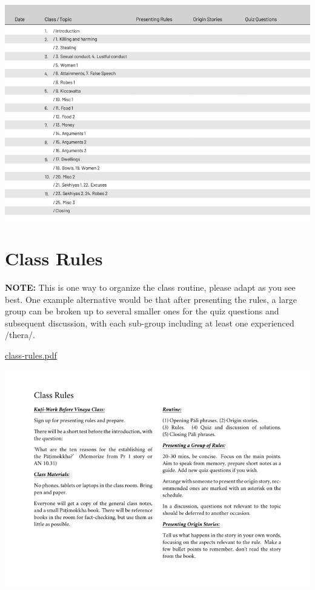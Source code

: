 \href{./includes/docs/sign-up-sheet.pdf}{\includegraphics{./includes/docs/sign-up-sheet-thumb.png}}

\section{Class Rules}

\textbf{NOTE:} This is one way to organize the class routine, please
adapt as you see best. One example alternative would be that after
presenting the rules, a large group can be broken up to several smaller
ones for the quiz questions and subsequent discussion, with each
sub-group including at least one experienced /thera/.

\href{./includes/docs/class-rules.pdf}{class-rules.pdf}

\href{./includes/docs/class-rules.pdf}{\includegraphics{./includes/docs/class-rules-thumb.png}}

